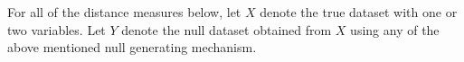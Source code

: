 \documentclass[12]{article}
\newcommand{\blue}[1]{{\color{blue} #1}}
\newcommand{\red}[1]{{\color{red} #1}}
\begin{document}
For all of the distance measures below, let $X$ denote the true dataset with one or two variables. Let $Y$ denote the null dataset obtained from $X$ using any of the above mentioned null generating mechanism.

\begin{itemize}













\end{itemize}
\end{document}
